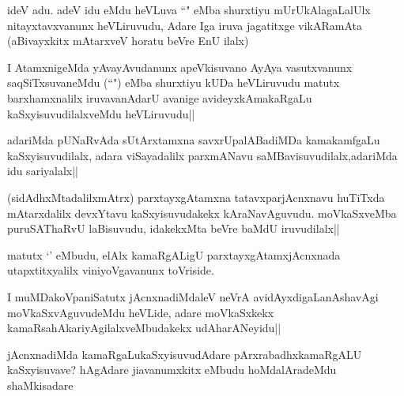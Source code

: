
\begin{artha}
ideV adu. adeV idu eMdu heVLuva ``\stext" eMba shurxtiyu mUrUkAlagaLalUlx nitayxtavxvanunx heVLiruvudu, Adare Iga iruva jagatitxge vikARamAta (aBivayxkitx mAtarxveV horatu beVre EnU ilalx)
\end{artha}

\begin{artha}
I AtamxnigeMda yAvayAvudanunx apeVkisuvano AyAya vasutxvanunx saqSiTxsuvaneMdu (``\stext") eMba shurxtiyu kUDa heVLiruvudu matutx barxhamxnalilx iruvavanAdarU avanige avideyxkAmakaRgaLu kaSxyisuvudilalxveMdu heVLiruvudu||
\end{artha}


\begin{artha}
adariMda pUNaRvAda sUtArxtamxna savxrUpalABadiMDa kamakamfgaLu kaSxyisuvudilalx, adara viSayadalilx parxmANavu saMBavisuvudilalx,adariMda idu sariyalalx||
\end{artha}


\begin{artha}
(sidAdhxMtadalilxmAtrx) parxtayxgAtamxna tatavxparjAcnxnavu huTiTxda mAtarxdalilx devxYtavu kaSxyisuvudakekx kAraNavAguvudu. moVkaSxveMba puruSAThaRvU laBisuvudu, idakekxMta beVre baMdU iruvudilalx||
\end{artha}

\begin{artha}
matutx `\stext' eMbudu, elAlx kamaRgALigU parxtayxgAtamxjAcnxnada utapxtitxyalilx viniyoVgavanunx toVriside.
\end{artha}

\begin{artha}
I muMDakoVpaniSatutx jAcnxnadiMdaleV neVrA avidAyxdigaLanAshavAgi moVkaSxvAguvudeMdu heVLide, adare moVkaSxkekx kamaRsahAkariyAgilalxveMbudakekx udAharANeyidu||
\end{artha}

\begin{artha}
jAcnxnadiMda kamaRgaLukaSxyisuvudAdare pArxrabadhxkamaRgALU kaSxyisuvave? hAgAdare jiavanumxkitx eMbudu hoMdalAradeMdu shaMkisadare
\end{artha}


